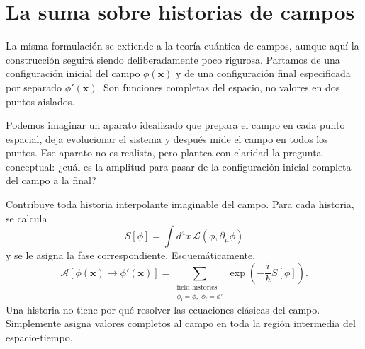 \begin{classroomqa}
\end{classroomqa}

\section{La suma sobre historias de campos}

La misma formulación se extiende a la teoría cuántica de campos, aunque aquí la construcción seguirá siendo deliberadamente poco rigurosa. Partamos de una configuración inicial del campo \(\phi(\mathbf{x})\) y de una configuración final especificada por separado \(\phi'(\mathbf{x})\). Son funciones completas del espacio, no valores en dos puntos aislados.

Podemos imaginar un aparato idealizado que prepara el campo en cada punto espacial, deja evolucionar el sistema y después mide el campo en todos los puntos. Ese aparato no es realista, pero plantea con claridad la pregunta conceptual: ¿cuál es la amplitud para pasar de la configuración inicial completa del campo a la final?

Contribuye toda historia interpolante imaginable del campo. Para cada historia, se calcula
\begin{equation}
S[\phi]=\int d^4x\,\mathcal{L}(\phi,\partial_\mu\phi)
\end{equation}
y se le asigna la fase correspondiente. Esquemáticamente,
\begin{equation}
\mathcal{A}\!\left[\phi(\mathbf{x})\rightarrow\phi'(\mathbf{x})\right]
=
\sum_{\substack{\text{field histories}\\
\phi_{\mathrm{i}}=\phi,\;\phi_{\mathrm{f}}=\phi'}}
\exp\!\left(-\frac{i}{\hbar}S[\phi]\right).
\end{equation}
Una historia no tiene por qué resolver las ecuaciones clásicas del campo. Simplemente asigna valores completos al campo en toda la región intermedia del espacio-tiempo.

\begin{classroomqa}
\end{classroomqa}

